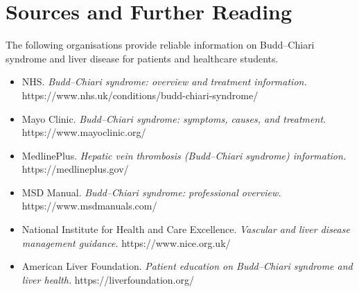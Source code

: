 \section*{Sources and Further Reading}
The following organisations provide reliable information on Budd--Chiari syndrome and liver disease for patients and healthcare students.

\begin{itemize}
    \item NHS. \textit{Budd--Chiari syndrome: overview and treatment information.} https://www.nhs.uk/conditions/budd-chiari-syndrome/
    \item Mayo Clinic. \textit{Budd--Chiari syndrome: symptoms, causes, and treatment.} https://www.mayoclinic.org/
    \item MedlinePlus. \textit{Hepatic vein thrombosis (Budd--Chiari syndrome) information.} https://medlineplus.gov/
    \item MSD Manual. \textit{Budd--Chiari syndrome: professional overview.} https://www.msdmanuals.com/
    \item National Institute for Health and Care Excellence. \textit{Vascular and liver disease management guidance.} https://www.nice.org.uk/
    \item American Liver Foundation. \textit{Patient education on Budd--Chiari syndrome and liver health.} https://liverfoundation.org/
\end{itemize}
